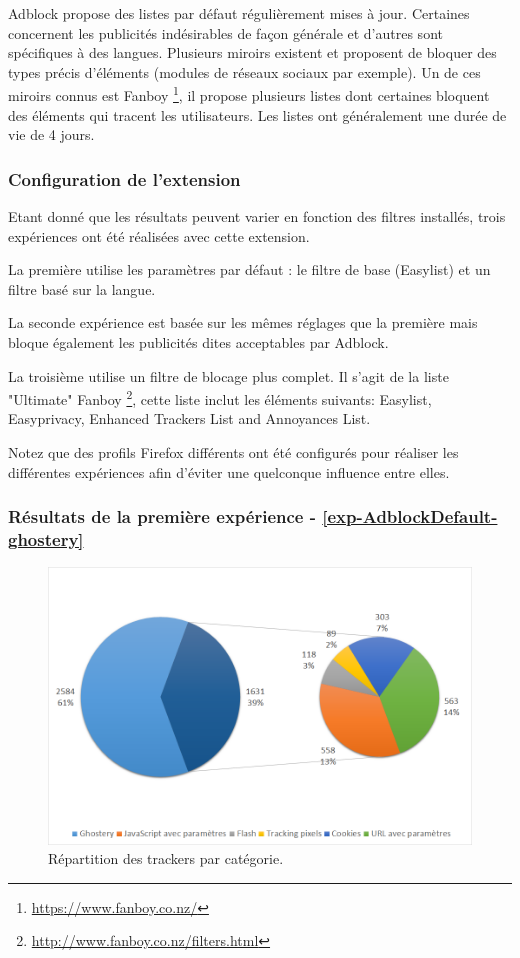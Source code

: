 Adblock propose des listes par défaut régulièrement mises à jour. Certaines concernent les publicités indésirables de façon générale et d'autres sont spécifiques à des langues. Plusieurs miroirs existent et proposent de bloquer des types précis d'éléments (modules de réseaux sociaux par exemple). Un de ces miroirs connus est Fanboy \footnote{\url{https://www.fanboy.co.nz/}}, il propose plusieurs listes dont certaines bloquent des éléments qui tracent les utilisateurs. Les listes ont généralement une durée de vie de 4 jours.

\subsubsection{Configuration de l'extension}
Etant donné que les résultats peuvent varier en fonction des filtres installés, trois expériences ont été réalisées avec cette extension.

La première utilise les paramètres par défaut : le filtre de base (Easylist) et un filtre basé sur la langue.

La seconde expérience est basée sur les mêmes réglages que la première mais bloque également les publicités dites acceptables par Adblock.

La troisième utilise un filtre de blocage plus complet. Il s'agit de la liste "Ultimate" Fanboy \footnote{\url{http://www.fanboy.co.nz/filters.html}}, cette liste inclut les éléments suivants: Easylist, Easyprivacy, Enhanced Trackers List and Annoyances List.

Notez que des profils Firefox différents ont été configurés pour réaliser les différentes expériences afin d'éviter une quelconque influence entre elles.

\subsubsection{Résultats de la première expérience - \autoref{exp-AdblockDefault-ghostery}}
\begin{figure}[!h]
	\centering
	\includegraphics[scale=.6]{resultats/ANALYSES/Images/AdblockDefault-Ghostery.png}
	\caption{\label{exp-AdblockDefault-ghostery}Répartition des trackers par catégorie.}
\end{figure}

